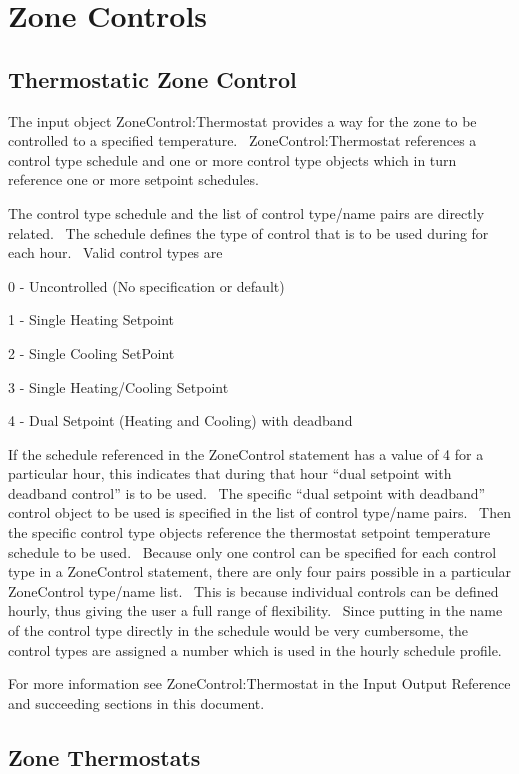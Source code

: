\section{Zone Controls }\label{zone-controls}

\subsection{Thermostatic Zone Control}\label{thermostatic-zone-control}

The input object ZoneControl:Thermostat provides a way for the zone to be controlled to a specified temperature.~ ZoneControl:Thermostat references a control type schedule and one or more control type objects which in turn reference one or more setpoint schedules.

The control type schedule and the list of control type/name pairs are directly related.~ The schedule defines the type of control that is to be used during for each hour.~ Valid control types are

0 - Uncontrolled (No specification or default)

1 - Single Heating Setpoint

2 - Single Cooling SetPoint

3 - Single Heating/Cooling Setpoint

4 - Dual Setpoint (Heating and Cooling) with deadband

If the schedule referenced in the ZoneControl statement has a value of 4 for a particular hour, this indicates that during that hour ``dual setpoint with deadband control'' is to be used.~ The specific ``dual setpoint with deadband'' control object to be used is specified in the list of control type/name pairs.~ Then the specific control type objects reference the thermostat setpoint temperature schedule to be used.~ Because only one control can be specified for each control type in a ZoneControl statement, there are only four pairs possible in a particular ZoneControl type/name list.~ This is because individual controls can be defined hourly, thus giving the user a full range of flexibility.~ Since putting in the name of the control type directly in the schedule would be very cumbersome, the control types are assigned a number which is used in the hourly schedule profile.

For more information see ZoneControl:Thermostat in the Input Output Reference and succeeding sections in this document.

\subsection{Zone Thermostats}\label{zone-thermostats}

